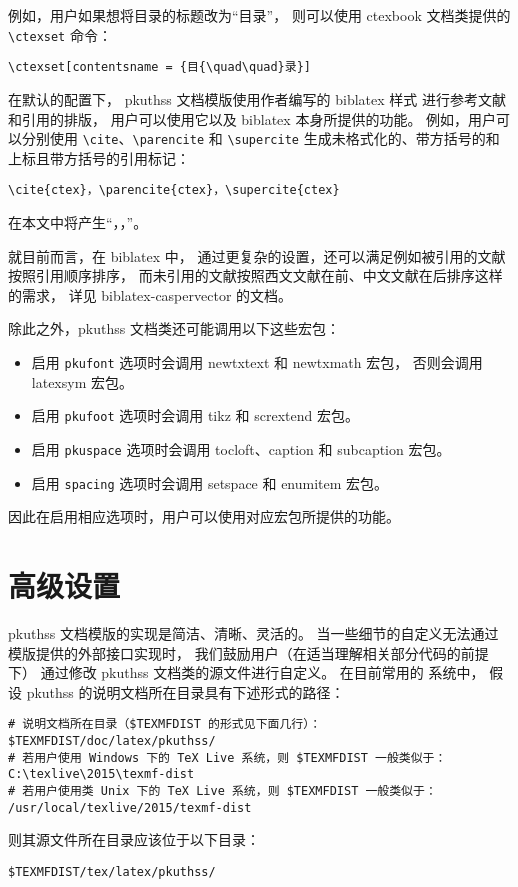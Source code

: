 例如，用户如果想将目录的标题改为“目{\quad\quad}录”，
则可以使用 ctexbook 文档类提供的 \verb|\ctexset| 命令：
\begin{Verbatim}[frame = single]
\ctexset[contentsname = {目{\quad\quad}录}]
\end{Verbatim}

在默认的配置下，%
pkuthss 文档模版使用作者编写的 biblatex\supercite{biblatex} 样式%
\mbox{\supercite{biblatex-caspervector}}进行参考文献和引用的排版，
用户可以使用它以及 biblatex 本身所提供的功能。
例如，用户可以分别使用 \verb|\cite|、\verb|\parencite| 和 \verb|\supercite|
生成未格式化的、带方括号的和上标且带方括号的引用标记：
\begin{Verbatim}[frame = single]
\cite{ctex}，\parencite{ctex}，\supercite{ctex}
\end{Verbatim}
在本文中将产生“\cite{ctex}，\parencite{ctex}，\supercite{ctex}”。

就目前而言，在 biblatex 中，
通过更复杂的设置，还可以满足例如被引用的文献按照引用顺序排序，
而未引用的文献按照西文文献在前、中文文献在后排序这样的需求，
详见 biblatex-caspervector 的文档\supercite{biblatex-caspervector}。

除此之外，pkuthss 文档类还可能调用以下这些宏包：
\begin{itemize}
	\item 启用 \verb|pkufont| 选项时会调用
		newtxtext 和 newtxmath\supercite{newtx} 宏包，
		否则会调用 latexsym\supercite{latexsym} 宏包。
	\item 启用 \verb|pkufoot| 选项时会调用
		tikz\supercite{tikz} 和 scrextend\supercite{scrextend} 宏包。
	\item 启用 \verb|pkuspace| 选项时会调用
		tocloft\supercite{tocloft}、caption\supercite{caption} 和
		subcaption\supercite{subcaption} 宏包。
	\item 启用 \verb|spacing| 选项时会调用 setspace 和
		enumitem\supercite{enumitem} 宏包。
\end{itemize}
因此在启用相应选项时，用户可以使用对应宏包所提供的功能。

\section{高级设置}\label{sec:advanced}

pkuthss 文档模版的实现是简洁、清晰、灵活的。
当一些细节的自定义无法通过模版提供的外部接口实现时，
我们鼓励用户（在适当理解相关部分代码的前提下）
通过修改 pkuthss 文档类的源文件进行自定义。
在目前常用的  系统中，
假设 pkuthss 的说明文档所在目录具有下述形式的路径：
\begin{Verbatim}[frame = single]
# 说明文档所在目录（$TEXMFDIST 的形式见下面几行）：
$TEXMFDIST/doc/latex/pkuthss/
# 若用户使用 Windows 下的 TeX Live 系统，则 $TEXMFDIST 一般类似于：
C:\texlive\2015\texmf-dist
# 若用户使用类 Unix 下的 TeX Live 系统，则 $TEXMFDIST 一般类似于：
/usr/local/texlive/2015/texmf-dist
\end{Verbatim}
则其源文件所在目录应该位于以下目录：
\begin{Verbatim}[frame = single]
$TEXMFDIST/tex/latex/pkuthss/
\end{Verbatim}

